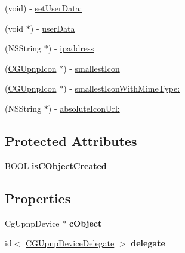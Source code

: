 \begin{DoxyCompactItemize}
(void) -\/ \hyperlink{interface_c_g_upnp_device_ae42f2a0fa13ff0c7997d70f2630606b2}{set\-User\-Data\-:}
\item 
(void $\ast$) -\/ \hyperlink{interface_c_g_upnp_device_a420fd4621ae036b53494d35339261285}{user\-Data}
\item 
(N\-S\-String $\ast$) -\/ \hyperlink{interface_c_g_upnp_device_a75221973da0bd5ce9926e452e880a82d}{ipaddress}
\item 
(\hyperlink{interface_c_g_upnp_icon}{C\-G\-Upnp\-Icon} $\ast$) -\/ \hyperlink{interface_c_g_upnp_device_a150cb5a442d785934313013f0728e3b5}{smallest\-Icon}
\item 
(\hyperlink{interface_c_g_upnp_icon}{C\-G\-Upnp\-Icon} $\ast$) -\/ \hyperlink{interface_c_g_upnp_device_a12a4dc65083fe126e790d2a95a80e51f}{smallest\-Icon\-With\-Mime\-Type\-:}
\item 
(N\-S\-String $\ast$) -\/ \hyperlink{interface_c_g_upnp_device_a0212353e65464c7549bf084a2dd7f7a8}{absolute\-Icon\-Url\-:}
\end{DoxyCompactItemize}
\subsection*{Protected Attributes}
\begin{DoxyCompactItemize}
\item 
\hypertarget{interface_c_g_upnp_device_aec91a483ed32fefce1f00872ec9222e3}{B\-O\-O\-L {\bfseries is\-C\-Object\-Created}}\label{interface_c_g_upnp_device_aec91a483ed32fefce1f00872ec9222e3}

\end{DoxyCompactItemize}
\subsection*{Properties}
\begin{DoxyCompactItemize}
\item 
\hypertarget{interface_c_g_upnp_device_a5bca421cef09c2c3c5345c2f047001b9}{Cg\-Upnp\-Device $\ast$ {\bfseries c\-Object}}\label{interface_c_g_upnp_device_a5bca421cef09c2c3c5345c2f047001b9}

\item 
\hypertarget{interface_c_g_upnp_device_ad1a85a2d4d616c87c3a6f51795b05a7a}{id$<$ \hyperlink{protocol_c_g_upnp_device_delegate-p}{C\-G\-Upnp\-Device\-Delegate} $>$ {\bfseries delegate}}\label{interface_c_g_upnp_device_ad1a85a2d4d616c87c3a6f51795b05a7a}

\end{DoxyCompactItemize}


